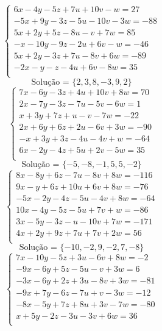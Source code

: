\documentclass[12pt,oneside,a4paper]{article}
\begin{document}
\vspace{\baselineskip}
\begin{equation*}
\begin{cases}
6x-4y-5z+7u+10v-w=27 \\
-5x+9y-3z-5u-10v-3w=-88 \\
5x+2y+5z-8u-v+7w=85 \\
-x-10y-9z-2u+6v-w=-46 \\
5x+2y-3z+7u-8v+6w=-89 \\
-2x-y-z-4u+6v-8w=35 \\
\end{cases}
\end{equation*}
\begin{equation*}
\text{Solução = }\{2,3,8,-3,9,2\}
\end{equation*}
\vspace{\baselineskip}
\begin{equation*}
\begin{cases}
7x-6y-3z+4u+10v+8w=70 \\
2x-7y-3z-7u-5v-6w=1 \\
x+3y+7z+u-v-7w=-22 \\
2x+6y+6z+2u-6v+3w=-90 \\
-x+3y+3z-4u-4v+w=-64 \\
6x-2y-4z+5u+2v-5w=35 \\
\end{cases}
\end{equation*}
\begin{equation*}
\text{Solução = }\{-5,-8,-1,5,5,-2\}
\end{equation*}
\vspace{\baselineskip}
\begin{equation*}
\begin{cases}
8x-8y+6z-7u-8v+8w=-116 \\
9x-y+6z+10u+6v+8w=-76 \\
-5x-2y-4z-5u-4v+8w=-64 \\
10x-4y-5z-5u+7v+w=-86 \\
3x-5y-3z-u-10v+7w=-171 \\
4x+2y+9z+7u+7v+2w=56 \\
\end{cases}
\end{equation*}
\begin{equation*}
\text{Solução = }\{-10,-2,9,-2,7,-8\}
\end{equation*}
\vspace{\baselineskip}
\begin{equation*}
\begin{cases}
7x-10y-5z+3u-6v+8w=-2 \\
-9x-6y+5z-5u-v+3w=6 \\
-3x-6y+2z+3u-8v+3w=-81 \\
-9x+7y-6z-7u+v-3w=-12 \\
-8x-5y+7z+8u+3v-7w=-80 \\
x+5y-2z-3u-3v+6w=36 \\
\end{cases}
\end{equation*}
\end{document}
